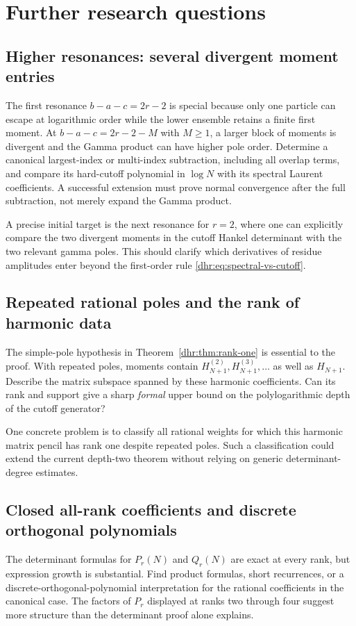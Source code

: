 \section{Further research questions}
\label{dhr:sec:research}

\subsection{Higher resonances: several divergent moment entries}
The first resonance $b-a-c=2r-2$ is special because only one particle
can escape at logarithmic order while the lower ensemble retains a
finite first moment. At $b-a-c=2r-2-M$ with $M\geq1$, a larger
block of moments is divergent and the Gamma product can have higher
pole order. Determine a canonical largest-index or multi-index
subtraction, including all overlap terms, and compare its hard-cutoff
polynomial in $\log N$ with its spectral Laurent coefficients.
A successful extension must prove normal convergence after the full
subtraction, not merely expand the Gamma product.

A precise initial target is the next resonance for $r=2$, where one
can explicitly compare the two divergent moments in the cutoff
Hankel determinant with the two relevant gamma poles. This should
clarify which derivatives of residue amplitudes enter beyond the
first-order rule \eqref{dhr:eq:spectral-vs-cutoff}.

\subsection{Repeated rational poles and the rank of harmonic data}
The simple-pole hypothesis in Theorem~\ref{dhr:thm:rank-one} is
essential to the proof. With repeated poles, moments contain
$H_{N+1}^{(2)},H_{N+1}^{(3)},\ldots$ as well as $H_{N+1}$.
Describe the matrix subspace spanned by these harmonic coefficients.
Can its rank and support give a sharp \emph{formal} upper bound on
the polylogarithmic depth of the cutoff generator?

One concrete problem is to classify all rational weights for which
this harmonic matrix pencil has rank one despite repeated poles.
Such a classification could extend the current depth-two theorem
without relying on generic determinant-degree estimates.

\subsection{Closed all-rank coefficients and discrete orthogonal polynomials}
The determinant formulas for $P_r(N)$ and $Q_r(N)$ are exact at every
rank, but expression growth is substantial. Find product formulas,
short recurrences, or a discrete-orthogonal-polynomial interpretation
for the rational coefficients in the canonical case. The factors of
$P_r$ displayed at ranks two through four suggest more structure
than the determinant proof alone explains.

